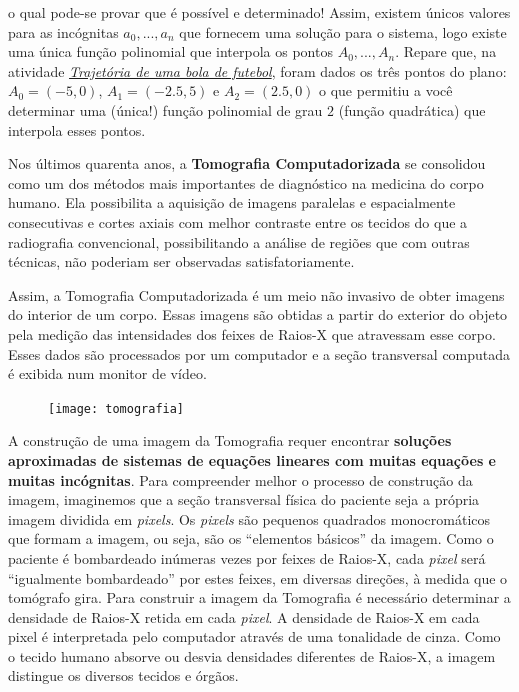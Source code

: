 o qual pode-se provar que é possível e determinado! Assim, existem únicos valores para as incógnitas $a_0, ..., a_n$ que fornecem uma solução para o sistema, logo existe uma única função polinomial que interpola os pontos $A_0, ..., A_n$. Repare que, na atividade \textit{\hyperref[trajetoria]{Trajetória de uma bola de futebol}}, foram dados os três pontos do plano: $A_0 = (-5,0)$, $A_1 = (-2.5, 5)$ e $A_2 = (2.5, 0)$ o que permitiu a você determinar uma (única!) função polinomial de grau $2$ (função quadrática) que interpola esses pontos. 


\begin{knowledge}

Nos últimos quarenta anos, a \textbf{Tomografia Computadorizada} se consolidou como um dos métodos mais importantes de diagnóstico na medicina do corpo humano. Ela possibilita a aquisição de imagens paralelas e espacialmente consecutivas e cortes axiais com melhor contraste entre os tecidos do que a radiografia convencional, possibilitando a análise de regiões que com outras técnicas, não poderiam ser observadas satisfatoriamente.

Assim, a Tomografia Computadorizada é um meio não invasivo
de obter imagens do interior de um corpo. Essas imagens são obtidas a partir do exterior do objeto pela medição das intensidades dos feixes de Raios-X que atravessam esse corpo. Esses dados são processados
por um computador e a seção transversal computada é exibida num monitor de vídeo.
\begin{figure}[H]
\centering
\noindent\texttt{[image: tomografia]}
\end{figure}
A construção de uma imagem da Tomografia requer encontrar \textbf{soluções aproximadas de sistemas de equações lineares com muitas equações e muitas incógnitas}. Para compreender melhor o processo de construção da imagem, imaginemos que a seção transversal física do paciente seja a própria imagem dividida em \emph{pixels}. Os \emph{pixels} são pequenos quadrados monocromáticos que formam a imagem, ou seja, são os “elementos básicos”{} da imagem. Como o paciente é bombardeado inúmeras vezes por feixes de Raios-X, cada \emph{pixel} será “igualmente bombardeado”{} por estes feixes, em diversas direções, à medida que o tomógrafo gira. Para construir a imagem da Tomografia é necessário determinar a densidade de Raios-X retida em cada \emph{pixel}. A densidade de Raios-X em cada pixel é interpretada pelo computador através de uma tonalidade de cinza. Como o tecido humano absorve ou desvia densidades diferentes de Raios-X, a imagem distingue os diversos tecidos e órgãos.


\end{knowledge}
